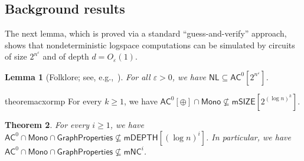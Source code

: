 \documentclass[10pt,a4paper]{article}
\newtheorem{theorem}{Theorem}[section]
\newtheorem{lemma}[theorem]{Lemma}
\newcommand{\eps}{\varepsilon}
\newcommand{\complexityfont}[1]{\mathsf{#1}}
\newcommand{\monclass}[1]{\mathsf{m}#1}
\def\mNC          {\monclass{\NC}}
\newcommand\NL           {\complexityfont{NL}}
\def\AC           {\complexityfont{AC}}
\def\NC           {\complexityfont{NC}}
\def\SIZE         {\complexityfont{SIZE}}
\def\DEPTH        {\complexityfont{DEPTH}}
\def\mSIZE        {\monclass{\SIZE}}
\def\mDEPTH       {\monclass{\DEPTH}}
\newcommand{\semMon}[1]{#1 \cap \monfns}
\newcommand{\monfns}{\mathsf{Mono}}
\newcommand{\GraphPpts}{\mathsf{GraphProperties}}
\def\sseq{\subseteq}
\begin{document}
\subsection{Background results}


The next lemma, which is proved via a standard ``guess-and-verify''
approach, shows that nondeterministic logspace computations can be
simulated by circuits of size $2^{n^{\varepsilon}}$ and of depth $d =
O_\varepsilon(1)$.

\begin{lemma}[Folklore; see, e.g.,~{\cite[Lemma 8.1]{AHMPS08}}]
    \label{lemma:ac0_nc1_sim}
    For all $\eps > 0$, we have
    $\NL \sseq \AC^0[2^{n^\eps}]$.
\end{lemma}







\begin{restatable}{theorem}{acxormp}
    \label{thm:ac02-mp-intro}
    For every $k \geq 1$,
    we have
$\semMon{\AC^0[\oplus]} \not\sseq \mSIZE[2^{(\log n)^k}]$.
\end{restatable}

\begin{theorem}
    \label{thm:ac0-fml-graph}
    For every $i \geq 1$,
    we have
    $\semMon{\AC^0} \cap \GraphPpts \not\sseq \mDEPTH[(\log n)^i]$.
    In particular, we have
    $\semMon{\AC^0} \cap \GraphPpts \not\sseq \mNC^i$.
\end{theorem}
\end{document}
